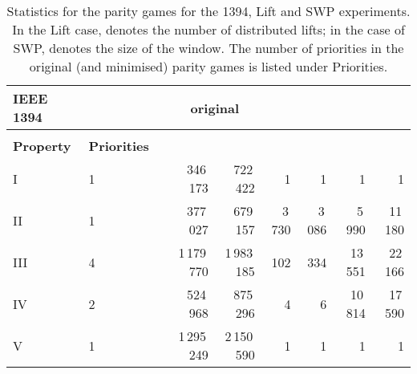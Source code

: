 \documentclass[a4paper]{llncs}
\begin{document}
\begin{table}[!ht]
  \centering
  \vspace{1em}
  \caption{Statistics for the parity games for the 1394, Lift and SWP
  experiments. In the Lift case,  denotes the number of distributed
  lifts; in the case of SWP,  denotes the size of the window. The
  number of priorities in the original (and minimised)
  parity games is listed under Priorities.}
  \label{tab:sizes}  
  \setlength{\tabcolsep}{3.5pt}
\begin{tabular}{lll||rr|rr|rr}\\
\textbf{IEEE 1394} & & &
\multicolumn{2}{c}{\textbf{original}} & \multicolumn{2}{c}{} & \multicolumn{2}{c}{} \\
\hline
\hline
& & & \\
\textbf{Property} & \textbf{Priorities} &  &
\textbf{} & \textbf{~} & \textbf{} & \textbf{~} & \textbf{} & \textbf{} \\
\hline 
I & 1 &  & 346\,173 & 722\,422 & 1 & 1 & 1 & 1 \\ \hline 
 II & 1 &  & 377\,027 & 679\,157 & 3\,730 & 3\,086 & 5\,990 & 11\,180 \\ \hline 
 III & 4 &  & 1\,179\,770 & 1\,983\,185 & 102 & 334 & 13\,551 & 22\,166 \\ \hline 
 IV & 2 &  & 524\,968 & 875\,296 & 4 & 6 & 10\,814 & 17\,590 \\ \hline 
 V & 1 &  & 1\,295\,249 & 2\,150\,590 & 1 & 1 & 1 & 1  \\ \hline 


\end{tabular}
\end{table}
\end{document}
